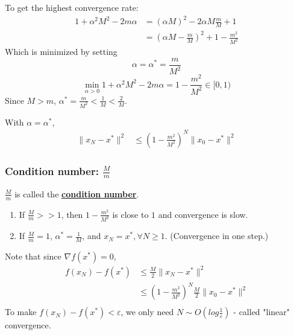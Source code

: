 \documentclass[11pt,a4paper]{article}
\begin{document}
To get the highest convergence rate:
\begin{equation}
    \begin{aligned}
        1+\alpha^2M^2-2m\alpha&=(\alpha M)^2-2\alpha M\frac{m}{M}+1\\
        &=(\alpha M-\frac{m}{M})^2+1-\frac{m^2}{M^2}
    \end{aligned}
    \nonumber
\end{equation}
Which is minimized by setting $$\alpha=\alpha^*=\frac{m}{M^2}$$
$$\min_{\alpha>0}1+\alpha^2M^2-2m\alpha=1-\frac{m^2}{M^2}\in[0,1)$$
Since $M>m$, $\alpha^*=\frac{m}{M^2}<\frac{1}{M}<\frac{2}{M}$.

With $\alpha=\alpha^*$,
\begin{equation}
    \begin{aligned}
        \|x_{N}-x^*\|^2&\leq (1-\frac{m^2}{M^2})^N\|x_0-x^*\|^2
    \end{aligned}
    \nonumber
\end{equation}

\subsubsection{Condition number: $\frac{M}{m}$}
$\frac{M}{m}$ is called the \textbf{\underline{condition number}}.
\begin{enumerate}[$\bullet$]
    \item If $\frac{M}{m}>>1$, then $1-\frac{m^2}{M^2}$ is close to $1$ and convergence is slow.
    \item If $\frac{M}{m}=1$, $\alpha^*=\frac{1}{M}$, and $x_N=x^*,\forall N\geq 1$. (Convergence in one step.)
\end{enumerate}
Note that since $\nabla f(x^*)=0$,
\begin{equation}
    \begin{aligned}
        f(x_N)-f(x^*)&\leq \frac{M}{2}\|x_N-x^*\|^2\\
        &\leq (1-\frac{m^2}{M^2})^N\frac{M}{2}\|x_0-x^*\|^2\\
    \end{aligned}
    \nonumber
\end{equation}
To make $f(x_N)-f(x^*)<\varepsilon$, we only need $N\sim O(log\frac{1}{\varepsilon})$ - called "linear" convergence.
\end{document}
